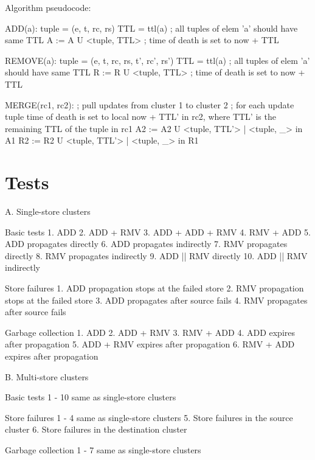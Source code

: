\begin{spverbatim}
Algorithm pseudocode:

ADD(a):
    tuple = (e, t, rc, rs)
    TTL = ttl(a)      ; all tuples of elem 'a' should have same TTL
    A := A U {<tuple, TTL>}  ; time of death is set to now + TTL

REMOVE(a):
    tuple = (e, t, rc, rs, t', rc', rs')
    TTL = ttl(a)      ; all tuples of elem 'a' should have same TTL
    R := R U {<tuple, TTL>}  ; time of death is set to now + TTL

MERGE(rc1, rc2):      ; pull updates from cluster 1 to cluster 2
    ; for each update tuple time of death is set to local now + TTL' in rc2, where TTL' is the remaining TTL of the tuple in rc1
    A2 := A2 U {<tuple, TTL'> | <tuple, _> in A1}
    R2 := R2 U {<tuple, TTL'> | <tuple, _> in R1}
\end{spverbatim}

\clearpage

\section{Tests}

\begin{spverbatim}
A. Single-store clusters
	
	Basic tests
	1. ADD
	2. ADD + RMV
	3. ADD + ADD + RMV
	4. RMV + ADD
	5. ADD propagates directly
	6. ADD propagates indirectly
	7. RMV propagates directly
	8. RMV propagates indirectly
	9. ADD || RMV directly
	10. ADD || RMV indirectly
	
	Store failures
	1. ADD propagation stops at the failed store
	2. RMV propagation stops at the failed store
	3. ADD propagates after source fails
	4. RMV propagates after source fails
	
	Garbage collection
	1. ADD
	2. ADD + RMV
	3. RMV + ADD
	4. ADD expires after propagation
	5. ADD + RMV expires after propagation
	6. RMV + ADD expires after propagation
	
B. Multi-store clusters
	
	Basic tests
	1 - 10 same as single-store clusters
	
	Store failures
	1 - 4 same as single-store clusters
	5. Store failures in the source cluster
	6. Store failures in the destination cluster
	
	Garbage collection
	1 - 7 same as single-store clusters
\end{spverbatim}
